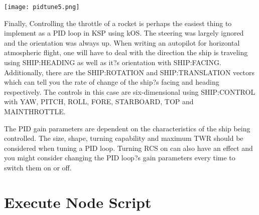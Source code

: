 \begin{center}
\texttt{[image: pidtune5.png]}
\end{center}

Finally, Controlling the throttle of a rocket is perhaps the easiest thing to implement as a PID loop in KSP using kOS. The steering was largely ignored and the orientation was always up. When writing an autopilot for horizontal atmospheric flight, one will have to deal with the direction the ship is traveling using SHIP:HEADING as well as it?s orientation with SHIP:FACING. Additionally, there are the SHIP:ROTATION and SHIP:TRANSLATION vectors which can tell you the rate of change of the ship?s facing and heading respectively. The controls in this case are six-dimensional using SHIP:CONTROL with YAW, PITCH, ROLL, FORE, STARBOARD, TOP and MAINTHROTTLE.

The PID gain parameters are dependent on the characteristics of the ship being controlled. The size, shape, turning capability and maximum TWR should be considered when tuning a PID loop. Turning RCS on can also have an effect and you might consider changing the PID loop?s gain parameters every time to switch them on or off.
	\section{Execute Node Script}